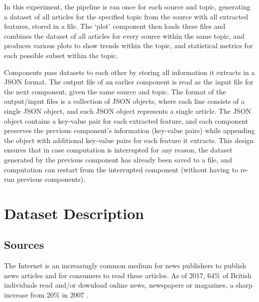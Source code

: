 \documentclass{report}
\begin{document}
In this experiment, the pipeline is ran once for each source and topic, generating a dataset of all articles for the specified topic from the source with all extracted features, stored in a file.
The `plot' component then loads these files and combines the dataset of all articles for every source within the same topic, and produces various plots to show trends within the topic, and statistical metrics for each possible subset within the topic.

Components pass datasets to each other by storing all information it extracts in a JSON format.
The output file of an earlier component is read as the input file for the next component, given the same source and topic.
The format of the output/input files is a collection of JSON objects, where each line consists of a single JSON object, and each JSON object represents a single article.
The JSON object contains a key-value pair for each extracted feature, and each component preserves the previous component's information (key-value pairs) while appending the object with additional key-value pairs for each feature it extracts.
This design ensures that in case computation is interrupted for any reason, the dataset generated by the previous component has already been saved to a file, and computation can restart from the interrupted component (without having to re-run previous components).

\section{Dataset Description} \label{Dataset Description}  %

\subsection{Sources} \label{sources}

The Internet is an increasingly common medium for news publishers to publish news articles and for consumers to read these articles.
As of 2017, 64\% of British individuals read and/or download online news, newspapers or magazines, a sharp increase from 20\% in 2007 \cite{statista2018share}. 
\end{document}
